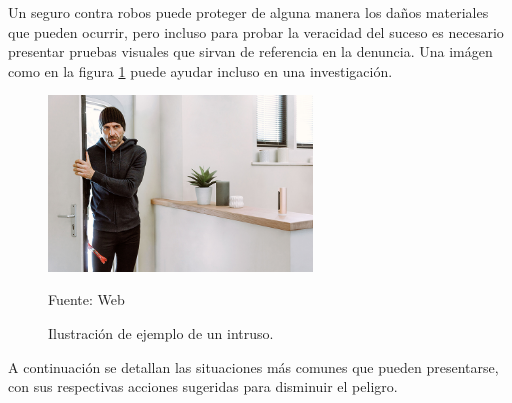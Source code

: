 Un seguro contra robos puede proteger de alguna manera los daños materiales que pueden ocurrir, pero incluso para probar la veracidad del suceso es necesario presentar pruebas visuales que sirvan de referencia en la denuncia. Una imágen como en la figura \ref{fig:intruso} puede ayudar incluso en una investigación.\\

\begin{figure}[H]
    \begin{center}
        \includegraphics[width=7cm]{img/capitulo_3/intruso.jpg}
    \end{center}
    \begin{center}
        \caption{Ilustración de ejemplo de un intruso.}
        Fuente: Web
        \label{fig:intruso}
    \end{center}
\end{figure}

A continuación se detallan las situaciones más comunes que pueden presentarse, con sus respectivas acciones sugeridas para disminuir el peligro.\\

